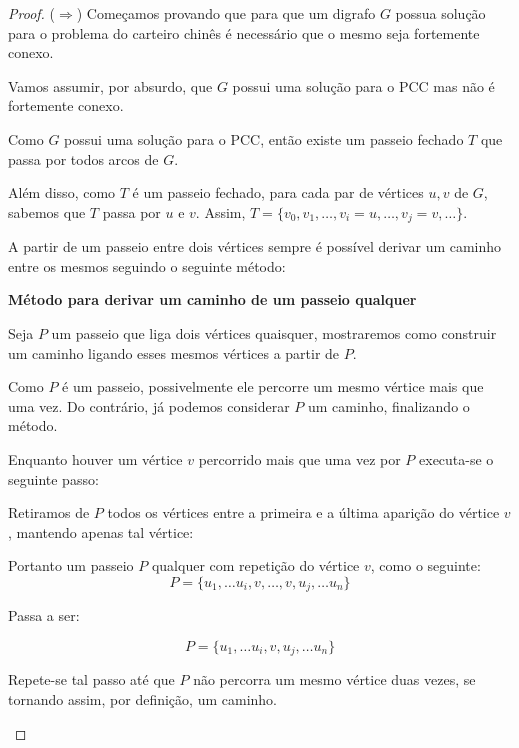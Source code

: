     \begin{proof}


        ($\Rightarrow$) Começamos provando que para que um digrafo $G$ possua solução para o problema do carteiro chinês é necessário que o mesmo seja fortemente conexo.

        Vamos assumir, por absurdo, que $G$ possui uma solução para o PCC mas não é fortemente conexo.

        Como $G$ possui uma solução para o PCC, então existe um passeio fechado $T$ que passa por todos arcos de $G$.

         Além disso, como $T$ é um passeio fechado, para cada par de vértices $u, v$ de $G$, sabemos que $T$ passa por $u$ e $v$.
         Assim, $T = \{ v_0, v_1, \dots, v_i = u, \dots, v_j = v, \dots \}$.

        A partir de um passeio entre dois vértices sempre é possível derivar um caminho entre os mesmos seguindo o seguinte método:

        \begin{tcolorbox}
            \textbf{Método para derivar um caminho de um passeio qualquer}
            
            Seja $P$ um passeio que liga dois vértices quaisquer, mostraremos como construir um caminho ligando esses mesmos vértices a partir de $P$.

            Como $P$ é um passeio, possivelmente ele percorre um mesmo vértice mais que uma vez. Do contrário, já podemos considerar $P$ um caminho, finalizando o método. 

            Enquanto houver um vértice $v$ percorrido mais que uma vez por $P$ executa-se o seguinte passo:
    

            Retiramos de $P$ todos os vértices entre a primeira e a última aparição do vértice $v$, mantendo apenas tal vértice: 


            Portanto um passeio $P$ qualquer com repetição do vértice $v$, como o seguinte:
            \[
                P = \{ u_1, \dots u_i, v, \dots, v, u_j, \dots u_n\}
            \]

            Passa a ser:


            \[
                P = \{ u_1, \dots u_i, v, u_j, \dots u_n\}
            \]

            Repete-se tal passo até que $P$ não percorra um mesmo vértice duas vezes, se tornando assim, por definição, um caminho.

        \end{tcolorbox}
         

\end{proof}
